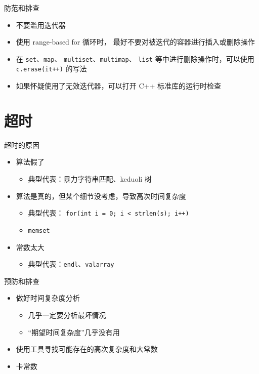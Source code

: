 \documentclass[10pt,mathserif]{beamer}%
\begin{document}
\begin{frame}{防范和排查}
	\begin{itemize}
		\item 不要滥用迭代器
		\item 使用 range-based for 循环时，
			最好不要对被迭代的容器进行插入或删除操作
		\item 在 \lstinline|set|、\lstinline|map|、
			\lstinline|multiset|、\lstinline|multimap|、
			\lstinline|list| 等中进行删除操作时，可以使用
			\lstinline|c.erase(it++)| 的写法
		\item 如果怀疑使用了无效迭代器，可以打开 C++ 标准库的运行时检查
	\end{itemize}
\end{frame}

\section{超时}
\begin{frame}{超时的原因}
	\begin{itemize}
		\item 算法假了
			\begin{itemize}
				\item<2> 典型代表：暴力字符串匹配、keduoli 树
			\end{itemize}
		\item 算法是真的，但某个细节没考虑，导致高次时间复杂度
			\begin{itemize}
				\item<2> 典型代表：
					\lstinline!for(int i = 0; i < strlen(s); i++)!
				\item<2> \lstinline!memset!
			\end{itemize}
		\item 常数太大
			\begin{itemize}
				\item<2> 典型代表：\lstinline!endl!、\lstinline!valarray!
			\end{itemize}
	\end{itemize}
\end{frame}

\begin{frame}{预防和排查}
	\begin{itemize}
		\item 做好时间复杂度分析
			\begin{itemize}
				\item 几乎一定要分析最坏情况
				\item “期望时间复杂度”几乎没有用
			\end{itemize}
		\item 使用工具寻找可能存在的高次复杂度和大常数
		\item 卡常数
	\end{itemize}
\end{frame}
\end{document}
